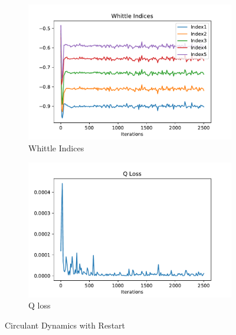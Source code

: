 \documentclass{article}
\theoremstyle{definition}
\begin{document}
\begin{figure}[H]
     \captionsetup[subfigure]{justification=centering}
     \centering
     \begin{subfigure}{0.48\linewidth}
         \centering
         \includegraphics[width=1\linewidth]{images/whittle2/Indices.pdf}
         \caption{Whittle Indices}
         \label{Whittle Indices 2}
     \end{subfigure}
     \begin{subfigure}{0.48\linewidth}
         \centering
         \includegraphics[width=1\linewidth]{images/whittle2/Q Loss.pdf}
         \caption{Q loss}
         \label{}
     \end{subfigure}
     \caption{Circulant Dynamics with Restart}
\end{figure}
\end{document}
